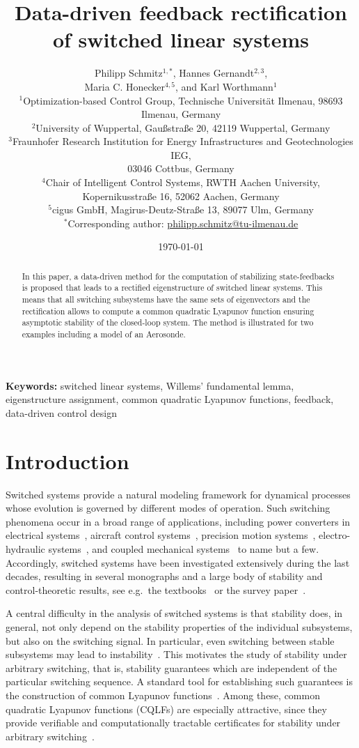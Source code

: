 \documentclass[11pt]{article}
\title{Data-driven feedback rectification of switched linear systems}
\author{%
\parbox{0.96\textwidth}{%
\centering
Philipp Schmitz$^{1,*}$, Hannes Gernandt$^{2,3}$,\\
Maria C. Honecker$^{4,5}$, and Karl Worthmann$^{1}$\\[0.75em]
\footnotesize
$^{1}$Optimization-based Control Group, Technische Universit\"at Ilmenau, 98693 Ilmenau, Germany\\
$^{2}$University of Wuppertal, Gau\ss stra\ss e 20, 42119 Wuppertal, Germany\\
$^{3}$Fraunhofer Research Institution for Energy Infrastructures and Geotechnologies IEG,\\ 03046 Cottbus, Germany\\
$^{4}$Chair of Intelligent Control Systems, RWTH Aachen University,\\ Kopernikusstra\ss e 16, 52062 Aachen, Germany\\
$^{5}$cigus GmbH, Magirus-Deutz-Stra\ss e 13, 89077 Ulm, Germany\\[0.5em]
$^{*}$Corresponding author: \href{mailto:philipp.schmitz@tu-ilmenau.de}{philipp.schmitz@tu-ilmenau.de}%
}%
}
\date{\today}
\theoremstyle{plain}
\theoremstyle{definition}
\theoremstyle{remark}
\begin{document}
\maketitle

\begin{abstract}
In this paper, a data-driven method for the computation of stabilizing state-feedbacks is proposed that leads to a rectified eigenstructure of switched linear systems. This means that all switching subsystems have the same sets of eigenvectors and the rectification allows to compute a common quadratic Lyapunov function ensuring asymptotic stability of the closed-loop system. The method is illustrated for two examples including a model of an Aerosonde.
\end{abstract}

\noindent\textbf{Keywords:} switched linear systems, Willems' fundamental lemma, eigenstructure assignment, common quadratic Lyapunov functions, feedback, data-driven control design

\section{Introduction}

Switched systems provide a natural modeling framework for dynamical processes whose evolution is governed by different modes of operation. Such switching phenomena occur in a broad range of applications, including power converters in electrical systems~\cite{trenn2012switched},
aircraft control systems~\cite{WangZS2016}, precision motion systems~\cite{HeertjesN2012}, electro-hydraulic systems~\cite{YuanDSB2017}, and coupled mechanical systems~\cite{Sajja2019} to name but a few. Accordingly, switched systems have been investigated extensively during the last decades, resulting in several monographs and a large body of stability and control-theoretic results, see e.g.\ the textbooks~\cite{Liberzon.2003,zhao2017control} or the survey paper~\cite{lin2009stability}.

A central difficulty in the analysis of switched systems is that stability does, in general, not only depend
on the stability properties of the individual subsystems, but also on the switching signal. In particular, even switching between stable subsystems may lead to instability~\cite{Liberzon.2003}.
This motivates the study of stability under arbitrary switching, that is, stability guarantees which are independent of the particular switching sequence.
A standard tool for establishing such guarantees is the construction of common Lyapunov functions~\cite{mason2023universal}. Among these, common quadratic Lyapunov functions (CQLFs) are especially attractive, since they provide verifiable and computationally tractable certificates for stability under arbitrary switching~\cite{andersen2022common}.
\end{document}
